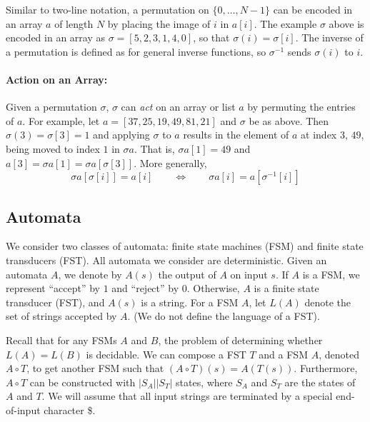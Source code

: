 \documentclass{llncs}
\begin{document}
    Similar to two-line notation, a permutation on \(\{0, \dotsc, N-1\}\) can be
    encoded in an array \(a\) of length \(N\) by placing the image of \(i\) in
    \(a[i]\).  The example \(\sigma\) above is encoded in an array as \(\sigma = [5,
    2, 3, 1, 4, 0]\), so that \(\sigma(i) = \sigma[i]\).
    The inverse of a permutation is defined as for general inverse functions,
    so $\sigma^{-1}$ sends $\sigma(i)$ to $i$.

  \paragraph{Action on an Array:}

    Given a permutation \(\sigma\), \(\sigma\) can {\it act} on an array or list \(a\)
    by permuting the entries of $a$.
    For example, let \(a = [37, 25, 19, 49, 81, 21]\) and \(\sigma\) be as above.  
    Then \(\sigma(3) = \sigma[3] = 1\) and applying \(\sigma\) to \(a\) results in the
    element of \(a\) at index \(3\), \(49\), being moved to index \(1\) in \(\sigma
    a\).  That is, \(\sigma a[1] = 49\) and \(a[3] = \sigma a[1] = \sigma
    a[\sigma[3]]\).  More generally,
    \begin{equation}
    \sigma a[\sigma[i]] = a[i] \qquad 
      \Longleftrightarrow \qquad \sigma a[i] = a[\sigma^{-1}[i]]
    \label{action}
    \end{equation}

    \vspace{-0.1in}
  \subsection{Automata}
    We consider two classes of automata: finite state machines (FSM) and finite
    state transducers (FST). All automata we consider are deterministic. Given an
    automata $A$, we denote by $A(s)$ the output of $A$ on input $s$. If $A$ is a
    FSM, we represent ``accept'' by $1$ and ``reject'' by $0$. Otherwise, $A$ is a
    finite state transducer (FST), and $A(s)$ is a string. For a FSM $A$, let $L(A)$
    denote the set of strings accepted by $A$. (We do not define the language of a
    FST).

    Recall that for any FSMs $A$ and $B$, the problem of determining whether $L(A) =
    L(B)$ is decidable. We can compose a FST $T$ and a FSM $A$, denoted $A \circ T$,
    to get another FSM such that $(A\circ T)(s) = A(T(s))$.
    Furthermore, $A\circ T$ can be constructed with $|S_A||S_T|$ states,
    where $S_A$ and $S_T$ are the states of $A$ and $T$.
    We will assume that all input strings are terminated by a special end-of-input character \$.

%
%


\end{document}
